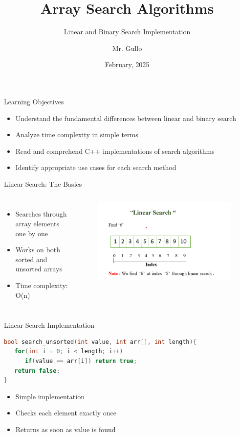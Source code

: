 \documentclass{beamer}
\title[Array Searching]{ Array Search Algorithms}
\subtitle{Linear and Binary Search Implementation}
\author[Mr. Gullo]{Mr. Gullo}
\date[Feb 2025]{February, 2025}
\begin{document}
\frame{\titlepage}

\begin{frame}{Learning Objectives}
\begin{itemize}
\item Understand the fundamental differences between linear and binary search
\item Analyze time complexity in simple terms
\item Read and comprehend C++ implementations of search algorithms
\item Identify appropriate use cases for each search method
\end{itemize}
\end{frame}

\begin{frame}{Linear Search: The Basics}
\begin{columns}
\begin{itemize}
\item Searches through array elements one by one
\item Works on both sorted and unsorted arrays
\item Time complexity: O(n)
\end{itemize}

\begin{figure}
    \centering
    \includegraphics[width=1\linewidth]{cs12-searching-linear-search-example.png}
\end{figure}
\end{columns}
\end{frame}

\begin{frame}[fragile]{Linear Search Implementation}
\begin{lstlisting}[language=C++]
bool search_unsorted(int value, int arr[], int length){
   for(int i = 0; i < length; i++)
      if(value == arr[i]) return true;
   return false;
}
\end{lstlisting}
\pause

\begin{itemize}
\item Simple implementation
\item Checks each element exactly once
\item Returns as soon as value is found
\end{itemize}
\end{frame}
\end{document}
